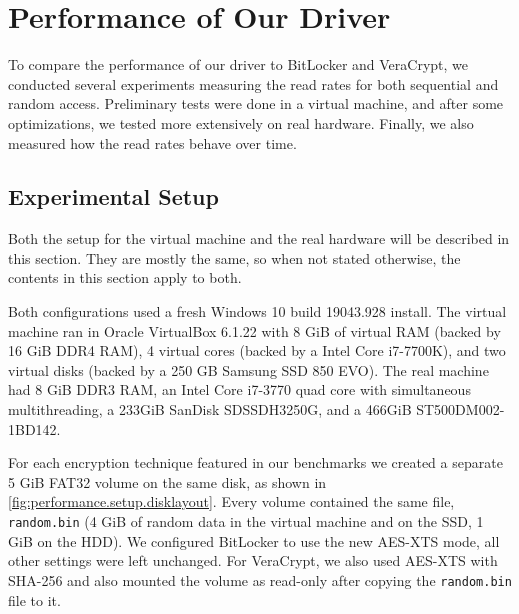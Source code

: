 \chapter{Performance of Our Driver}
\label{chap:performance}
To compare the performance of our driver to BitLocker and VeraCrypt, we conducted several experiments measuring the read rates for both sequential and random access. Preliminary tests were done in a virtual machine, and after some optimizations, we tested more extensively on real hardware. Finally, we also measured how the read rates behave over time.

\section{Experimental Setup}
\label{chap:performance.setup}
Both the setup for the virtual machine and the real hardware will be described in this section. They are mostly the same, so when not stated otherwise, the contents in this section apply to both.

Both configurations used a fresh Windows 10 build 19043.928 install. The virtual machine ran in Oracle VirtualBox 6.1.22 with 8 GiB of virtual RAM (backed by 16 GiB DDR4 RAM), 4 virtual cores (backed by a Intel Core i7-7700K), and two virtual disks (backed by a 250 GB Samsung SSD 850 EVO). The real machine had 8 GiB DDR3 RAM, an Intel Core i7-3770 quad core with simultaneous multithreading, a 233GiB SanDisk SDSSDH3250G, and a 466GiB ST500DM002-1BD142.

For each encryption technique featured in our benchmarks we created a separate 5 GiB FAT32 volume on the same disk, as shown in \autoref{fig:performance.setup.disklayout}. Every volume contained the same file, \texttt{random.bin} (4 GiB of random data in the virtual machine and on the SSD, 1 GiB on the HDD). We configured BitLocker to use the new AES-XTS mode, all other settings were left unchanged. For VeraCrypt, we also used AES-XTS with SHA-256 and also mounted the volume as read-only after copying the \texttt{random.bin} file to it.

